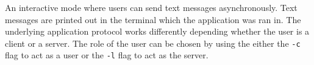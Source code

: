 An interactive mode where users can send text messages asynchronously. Text messages are printed out in the terminal which the application was ran in. The underlying application protocol works differently depending whether the user is a client or a server. The role of the user can be chosen by using the either the \texttt{-c} flag to act as a user or the \texttt{-l} flag to act as the server.
